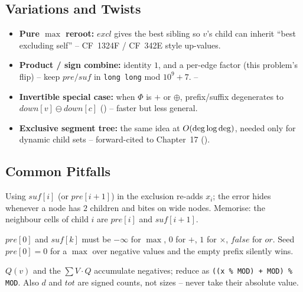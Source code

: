 \subsection{Variations and Twists}

\begin{itemize}[nosep]
  \item \textbf{Pure $\max$ reroot:} $\mathit{excl}$ gives the best sibling so
        $v$'s child can inherit ``best excluding self'' -- CF~1324F /
        CF~342E style up-values. \hfill{}
  \item \textbf{Product / sign combine:} identity $1$, and a per-edge factor
        (this problem's flip) -- keep $\mathit{pre}/\mathit{suf}$ in
        \lstinline{long long} mod $10^9{+}7$. \hfill{}--
  \item \textbf{Invertible special case:} when $\Phi$ is $+$ or $\oplus$,
        prefix/suffix degenerates to $\mathit{down}[v]\ominus\mathit{down}[c]$
        () -- faster but less general. \hfill{}
  \item \textbf{Exclusive segment tree:} the same idea at
        $O(\deg\log\deg)$, needed only for dynamic child sets --
        forward-cited to Chapter~17 (). \hfill{}
\end{itemize}

\subsection{Common Pitfalls}

\begin{warningbox}
Using $\mathit{suf}[i]$ (or $\mathit{pre}[i{+}1]$) in the exclusion re-adds
$x_i$; the error hides whenever a node has $2$ children and bites on wide nodes.
Memorise: the neighbour cells of child $i$ are $\mathit{pre}[i]$ and
$\mathit{suf}[i{+}1]$.
\end{warningbox}
\begin{warningbox}
$\mathit{pre}[0]$ and $\mathit{suf}[k]$ must be $-\infty$ for $\max$, $0$ for
$+$, $1$ for $\times$, $\mathit{false}$ for $\mathit{or}$. Seed $\mathit{pre}[0]=0$
for a $\max$ over negative values and the empty prefix silently wins.
\end{warningbox}
\begin{warningbox}
$Q(v)$ and the $\sum V\!\cdot\!Q$ accumulate negatives; reduce as
\lstinline{((x % MOD) + MOD) % MOD}. Also $d$ and $\mathit{tot}$ are signed
counts, not sizes -- never take their absolute value.
\end{warningbox}

